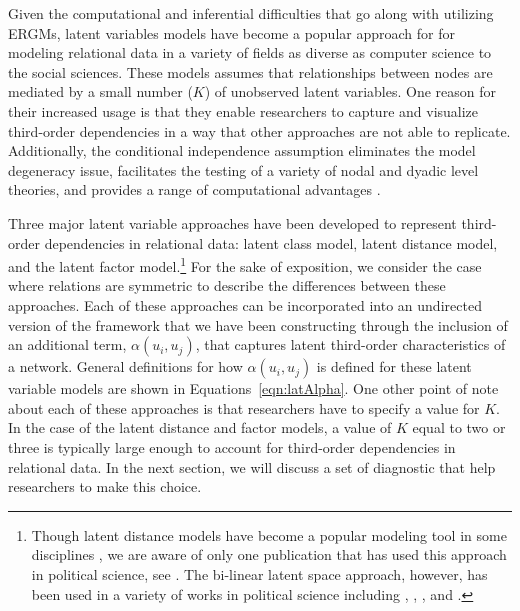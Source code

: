 Given the computational and inferential difficulties that go along with utilizing ERGMs, latent variables models have become a popular approach for for modeling relational data in a variety of fields as diverse as computer science to the social sciences. These models assumes that relationships between nodes are mediated by a small number ($K$) of unobserved latent variables. One reason for their increased usage is that they enable researchers to capture and visualize third-order dependencies in a way that other approaches are not able to replicate. Additionally, the conditional independence assumption eliminates the model degeneracy issue, facilitates the testing of a variety of nodal and dyadic level theories, and provides a range of computational advantages \citep{hunter:etal:2012}. 

Three major latent variable approaches have been developed to represent third-order dependencies in relational data: latent class model, latent distance model, and the latent factor model.\footnote{Though latent distance models have become a popular modeling tool in some disciplines \citep{salter:etal:2012}, we are aware of only one publication that has used this approach in political science, see \citet{kirkland:2012}. The bi-linear latent space approach, however, has been used in a variety of works in political science including \citet{ward:etal:2007}, \citet{cao:2009}, \citet{breunig:etal:2012}, and \citet{metternich:etal:2015}.} For the sake of exposition, we consider the case where relations are symmetric to describe the differences between these approaches. Each of these approaches can be incorporated into an undirected version of the framework that we have been constructing through the inclusion of an additional term, $\alpha(u_{i}, u_{j})$, that captures latent third-order characteristics of a network. General definitions for how $\alpha(u_{i}, u_{j})$ is defined for these latent variable models are shown in Equations~\ref{eqn:latAlpha}. One other point of note about each of these approaches is that researchers have to specify a value for $K$. In the case of the latent distance and factor models, a value of $K$ equal to two or three is typically large enough to account for third-order dependencies in relational data. In the next section, we will discuss a set of diagnostic that help researchers to make this choice.

